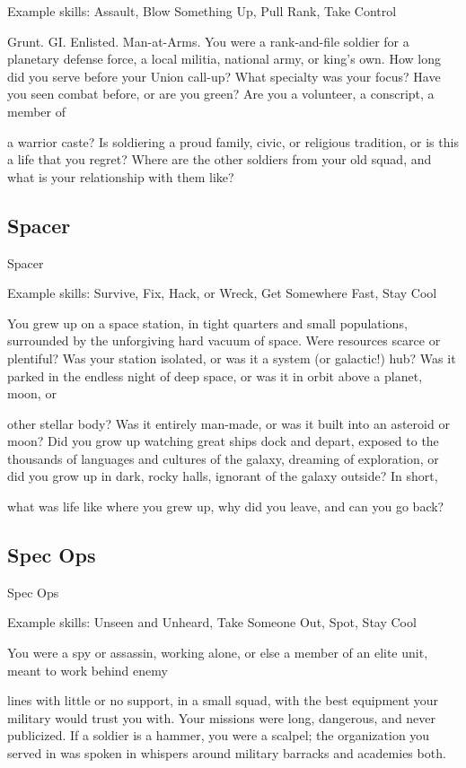 Example skills: Assault, Blow Something Up, Pull Rank, Take Control  

Grunt. GI. Enlisted. Man-at-Arms. You were a rank-and-file soldier for a planetary defense force, a local  
militia, national army, or king’s own. How long did you serve before your Union call-up? What specialty was  
your focus? Have you seen combat before, or are you green? Are you a volunteer, a conscript, a member of  

a warrior caste? Is soldiering a proud family, civic, or religious tradition, or is this a life that you regret?  
Where are the other soldiers from your old squad, and what is your relationship with them like?   
\subsection{Spacer}
                                                       Spacer
 

Example skills: Survive, Fix, Hack, or Wreck, Get Somewhere Fast, Stay Cool  

You grew up on a space station, in tight quarters and small populations, surrounded by the unforgiving hard  
vacuum of space. Were resources scarce or plentiful? Was your station isolated, or was it a system (or  
galactic!) hub? Was it parked in the endless night of deep space, or was it in orbit above a planet, moon, or  

other stellar body? Was it entirely man-made, or was it built into an asteroid or moon? Did you grow up  
watching great ships dock and depart, exposed to the thousands of languages and cultures of the galaxy,  
dreaming of exploration, or did you grow up in dark, rocky halls, ignorant of the galaxy outside? In short,  

what was life like where you grew up, why did you leave, and can you go back?   
\subsection{Spec Ops}
                                                     Spec Ops  

Example skills: Unseen and Unheard, Take Someone Out, Spot, Stay Cool  

You were a spy or assassin, working alone, or else a member of an elite unit, meant to work behind enemy  

lines with little or no support, in a small squad, with the best equipment your military would trust you with.  
Your missions were long, dangerous, and never publicized. If a soldier is a hammer, you were a scalpel; the  
organization you served in was spoken in whispers around military barracks and academies both.   
